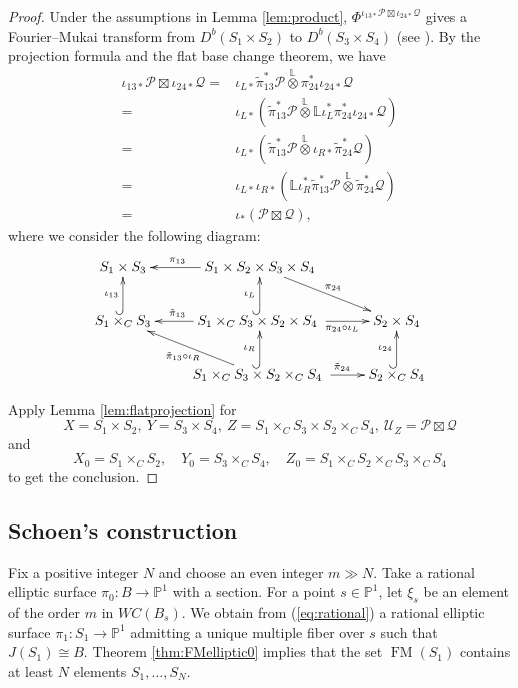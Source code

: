 \documentclass[a4paper,11pt]{article}
\theoremstyle{definition}\newtheorem{defn}[thm]{Definition}
\theoremstyle{remark}\newtheorem{remark}[thm]{Remark}
\numberwithin{equation}{section}
\newcommand{\LL}{\ensuremath{\mathbb{L}}}
\newcommand{\ltensor}{\overset{\LL}{\otimes}}
\newcommand{\FM}{\operatorname{FM}}
\newcommand{\mc}{\mathcal}
\newcommand{\PP}{\mathbb P}
\begin{document}
\begin{proof}
Under the assumptions in Lemma \ref{lem:product}, 
$\Phi ^{\iota_{13*}\mc P\boxtimes \iota_{24*}\mc Q}$ gives a 
Fourier--Mukai transform from
$D^b(S_1\times S_2)$ to $D^b(S_3\times S_4)$ 
(see \cite[Exercise 5.20]{Hu06}).
By the projection formula and the flat base change theorem, 
we have
%
\begin{align*}
{\iota_{13*}\mc P\boxtimes \iota_{24*}\mc Q}
=&\iota_{L*}\tilde{\pi}_{13}^*\mc P\ltensor 
\pi_{24}^*\iota_{24*}\mc Q \\
=&\iota_{L*}(\tilde{\pi}_{13}^*\mc P\ltensor 
\LL\iota_{L}^*\pi_{24}^*\iota_{24*}\mc Q) \\
=&\iota_{L*}(\tilde{\pi}_{13}^*\mc P\ltensor 
\iota_{R*} \tilde{\pi}_{24}^*\mc Q) \\
=&\iota_{L*}\iota_{R*}
(\LL\iota_{R}^* \tilde{\pi}_{13}^*\mc P\ltensor 
 \tilde{\pi}_{24}^*\mc Q) \\
=&\iota _*(\mc P\boxtimes \mc Q),
\end{align*}
where we consider the following diagram:
\[
\xymatrix{   S_1\times S_3 
& S_1\times S_2\times S_3\times S_4 \ar[l]_{\pi_{13}\qquad } \ar[dr]^{\pi_{24}}  
&     \\
  S_1\times_C S_3 \ar@{^{(}->}[u]^{\iota_{13}}
& S_1\times_C S_3 \times S_2\times S_4 \ar[l]_{\tilde{\pi}_{13}\qquad} 
\ \ar[r]_{\qquad \pi_{24}\circ \iota_L} 
\ar@{^{(}->}[u]^{\iota_{L}} 
& S_2\times S_4  \\
& S_1\times_C S_3 \times S_2\times_C S_4 
\ar[ul]^{\tilde{\pi}_{13}\circ \iota_R} 
\ \ar[r]^{\qquad \tilde{\pi}_{24}} 
\ar@{^{(}->}[u]^{\iota_{R}} 
& S_2\times_C S_4  \ar@{^{(}->}[u]^{\iota_{24}}  \\
}
\]

%

Apply Lemma \ref{lem:flatprojection} for 
$$
X=S_1\times S_2,\ Y=S_3\times S_4,\ 
Z=S_1\times_CS_3\times S_2\times_CS_4,\ \mc U_Z=\mc P\boxtimes \mc Q
$$
and 
$$
X_0=S_1\times _CS_2,\quad Y_0=S_3\times _CS_4,
\quad Z_0=S_1\times_CS_2\times_C S_3\times_CS_4
$$
to get the conclusion.
\end{proof}


\subsection{Schoen's construction}\label{subsection:schoen}
Fix a positive integer $N$ and
choose an even integer $m\gg N$.
Take a rational  elliptic surface $\pi_0\colon B\to \PP^1$ with a section.
For a point $s\in\PP^1$,
let $\xi_s$ be an element of the order $m$ in $WC(B_s)$. 
We obtain from (\ref{eq:rational}) 
a rational  elliptic surface 
$\pi_1\colon S_1\to \PP^1$
admitting a unique multiple fiber over $s$ 
such that $J(S_1)\cong B$.
Theorem \ref{thm:FMelliptic0} implies that 
the set $\FM(S_1)$ contains at least $N$ elements $S_1,\ldots,S_N$.
\end{document}
